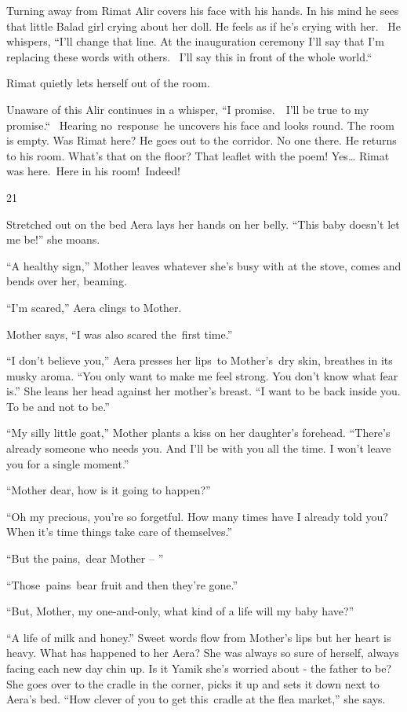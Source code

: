 \documentclass[twoside,11pt]{book}
\begin{document}
Turning away from Rimat Alir covers his face with his hands. In his mind he sees that little Balad girl crying about her
doll. He feels as if he's crying with her. ~He whispers, ``I'll change that line. At the inauguration
ceremony I'll say that I'm replacing these words with others.~ I'll say this in front of the whole
world.``\ 

Rimat quietly lets herself out of the room.

Unaware of this Alir continues in a whisper, ``I promise.\ \ I'll be true to my promise.``~
Hearing no\ response\ he uncovers his face and looks round. The room is empty. Was Rimat here? He goes out to the
corridor. No one there. He returns to his room. What's that on the floor? That leaflet with the poem! Yes{\dots} Rimat
was here.\ Here in his room!\ Indeed!


\bigskip

21 

Stretched out on the bed Aera lays her hands on her belly. ``This baby doesn't let me be!''
she moans.

``A healthy sign,'' Mother leaves whatever she's busy with at the stove, comes and bends over
her, beaming. 

``I'm scared,'' Aera clings to Mother{.}

Mother says, ``I was also scared the{\ }first time.'' 

``I don't believe you,'' Aera presses her lips{\ }to Mother's~dry skin,
breathes in its musky aroma. ``You only want to make me feel strong. You don't know what fear
is.'' She leans her head against her mother's breast. ``I want to be back inside you. To be
and not to be.'' 

``My silly little goat,'' Mother plants a kiss on her daughter's forehead.
``There's already someone who needs you. And I'll be with you all the time. I won't leave you for a single
moment.'' 

``Mother dear, how is it going to happen?'' 

``Oh my precious, you're so forgetful. How many times have I already told you? When it's time things take
care of themselves.'' 

``But the pains,~dear Mother -- '' 

``Those~pains~bear fruit and then they're gone.'' 

``But, Mother, my one-and-only, what kind of a life will my baby have?'' 

``A life of milk and honey.'' Sweet words flow from Mother's lips but her heart is heavy. What
has happened to her Aera? She was always so sure of herself, always facing each new day chin up. Is it Yamik she's
worried about - the father to be? She goes over to the cradle in the corner, picks it up and sets it down next to
Aera's bed. ``How clever of you to get this\ cradle at the flea market,'' she says.
\end{document}
